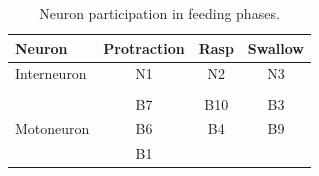 \begin{table}[h!]
	\centering
	\begin{tabular}{lccc}
		Neuron                                           & \multicolumn{1}{l}{Protraction} & \multicolumn{1}{l}{Rasp} & \multicolumn{1}{l}{Swallow} \\ \hline
		Interneuron                                     & N1                              & N2                       & N3                          \\
		& \multicolumn{1}{l}{}            & \multicolumn{1}{l}{}     & \multicolumn{1}{l}{}        \\
		\multicolumn{1}{c}{\multirow{3}{*}{Motoneuron}} & B7                              & B10                      & B3                        \\
		\multicolumn{1}{c}{}                            & B6                              & B4                       & B9                        \\
		\multicolumn{1}{c}{}                            & B1                              &                          &                         
	\end{tabular}
	\caption{Neuron participation in feeding phases.}
	\label{table:tabla spikes}
\end{table}



